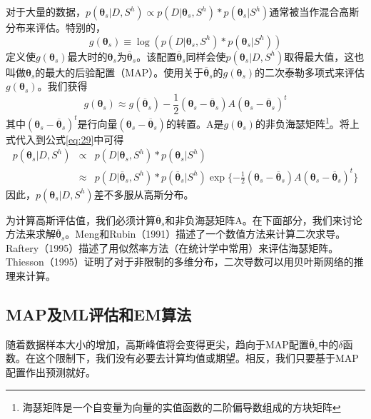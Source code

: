 \documentclass[10pt,a4paper]{article}
\begin{document}
\begin{CJK*}{UTF8}{gkai}
对于大量的数据，$p(\boldsymbol{\theta}_s|D,S^h) \propto p(D|\boldsymbol{\theta}_s,S^h)*p(\boldsymbol{\theta}_s|S^h)$通常被当作混合高斯分布来评估。特别的，
\begin{equation}
\label{eq:29}
g(\boldsymbol{\theta}_s)\equiv \log(p(D|\boldsymbol{\theta}_s,S^h)*p(\boldsymbol{\theta}_s|S^h))
\end{equation}
定义使$g(\boldsymbol{\theta}_s)$最大时的$\boldsymbol{\theta}_s$为$\overline{\boldsymbol{\theta}}_s$。该配置$\overline{\boldsymbol{\theta}}_s$同样会使$p(\boldsymbol{\theta}_s|D,S^h)$取得最大值，这也叫做$\boldsymbol{\theta}_s$的最大的后验配置（MAP）。使用关于$\overline{\boldsymbol{\theta}}_s$的$g(\boldsymbol{\theta}_s)$的二次泰勒多项式来评估$g(\boldsymbol{\theta}_s)$。我们获得
\begin{equation}
\label{eq:30}
g(\boldsymbol{\theta}_s) \approx g(\overline{\boldsymbol{\theta}}_s)-\frac{1}{2}
(\boldsymbol{\theta}_s-\overline{\boldsymbol{\theta}}_s)A
(\boldsymbol{\theta}_s-\overline{\boldsymbol{\theta}}_s)^t
\end{equation}
其中$(\boldsymbol{\theta}_s-\overline{\boldsymbol{\theta}}_s)^t$是行向量$(\boldsymbol{\theta}_s-\overline{\boldsymbol{\theta}}_s)$的转置。A是$g(\boldsymbol{\theta}_s)$的非负海瑟矩阵\footnote{海瑟矩阵是一个自变量为向量的实值函数的二阶偏导数组成的方块矩阵}。将上式代入到公式\ref{eq:29}中可得
\begin{eqnarray}
\label{eq:31}
p(\boldsymbol{\theta}_s|D,S^h) &\propto & 
p(D|\boldsymbol{\theta}_s,S^h)*p(\boldsymbol{\theta}_s|S^h)\\
& \approx & p(D|\overline{\boldsymbol{\theta}}_s,S^h)*p(\overline{\boldsymbol{\theta}}_s|S^h)\exp\{-\frac{1}{2}
(\boldsymbol{\theta}_s-\overline{\boldsymbol{\theta}}_s)A
(\boldsymbol{\theta}_s-\overline{\boldsymbol{\theta}}_s)^t\}\nonumber
\end{eqnarray}
因此，$p(\boldsymbol{\theta}_s|D,S^h)$差不多服从高斯分布。

为计算高斯评估值，我们必须计算$\overline{\boldsymbol{\theta}}_s$和非负海瑟矩阵A。在下面部分，我们来讨论方法来求解$\overline{\boldsymbol{\theta}}_s$。Meng和Rubin（1991）描述了一个数值方法来计算二次求导。Raftery（1995）描述了用似然率方法（在统计学中常用）来评估海瑟矩阵。Thiesson（1995）证明了对于非限制的多维分布，二次导数可以用贝叶斯网络的推理来计算。



\subsection{MAP及ML评估和EM算法}
随着数据样本大小的增加，高斯峰值将会变得更尖，趋向于MAP配置$\overline{\boldsymbol{\theta}}_s$中的$\delta$函数。在这个限制下，我们没有必要去计算均值或期望。相反，我们只要基于MAP配置作出预测就好。



\end{CJK*}
\end{document}
